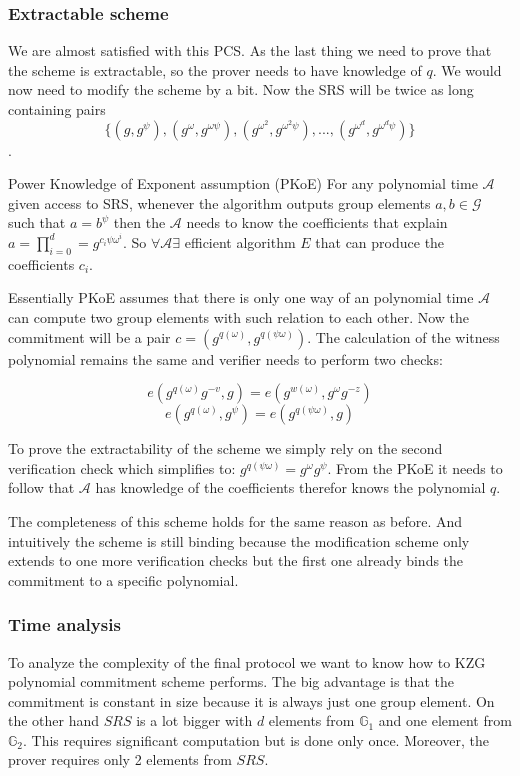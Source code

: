 \subsubsection{Extractable scheme}
We are almost satisfied with this PCS. As the last thing we need to prove that the scheme is extractable, so the prover needs to have knowledge of $q$. We would now need to modify the scheme by a bit. Now the SRS will be twice as long containing pairs $$\{(g, g^{\psi}), (g^{\omega}, g^{\omega \psi}), (g^{\omega^2}, g^{\omega^2 \psi}), ..., (g^{\omega^d}, g^{\omega^d \psi})\}$$. 

\begin{definition}{Power Knowledge of Exponent assumption (PKoE)}
    For any polynomial time $\mathcal{A}$ given access to SRS, whenever the algorithm outputs group elements $a, b \in \mathcal{G}$ such that $a = b^{\psi}$ then the $\mathcal{A}$ needs to know the coefficients that explain $a = \prod_{i=0}^d = g^{c_i \psi \omega^i}$. So $\forall \mathcal{A} \exists$ efficient algorithm $E$ that can produce the coefficients $c_i$.
\end{definition}

Essentially PKoE assumes that there is only one way of an polynomial time $\mathcal{A}$ can compute two group elements with such relation to each other. Now the commitment will be a pair $c = (g^{q(\omega)}, g^{q(\psi \omega)})$. The calculation of the witness polynomial remains the same and verifier needs to perform two checks:

$$e(g^{q(\omega)} g^{-v}, g) = e(g^{w(\omega)}, g^{\omega} g^{-z})$$
$$e(g^{q(\omega)}, g^\psi) = e(g^{q(\psi \omega)}, g)$$

To prove the extractability of the scheme we simply rely on the second verification check which simplifies to: $g^{q(\psi \omega)} = g^{\omega} g^{\psi}$. From the PKoE it needs to follow that $\mathcal{A}$ has knowledge of the coefficients therefor knows the polynomial $q$.

The completeness of this scheme holds for the same reason as before. And intuitively the scheme is still binding because the modification scheme only extends to one more verification checks but the first one already binds the commitment to a specific polynomial. 

\subsubsection{Time analysis}
To analyze the complexity of the final protocol we want to know how to KZG polynomial commitment scheme performs. The big advantage is that the commitment is constant in size because it is always just one group element. On the other hand $SRS$ is a lot bigger with $d$ elements from $\mathbb{G}_1$ and one element from $\mathbb{G}_2$. This requires significant computation but is done only once. Moreover, the prover requires only 2 elements from $SRS$. 

